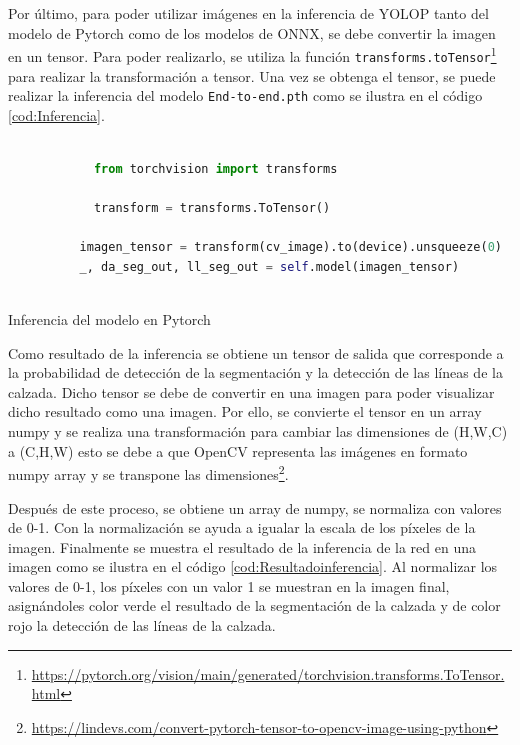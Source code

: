         Por último, para poder utilizar imágenes en la inferencia de YOLOP tanto del modelo de Pytorch como de los modelos de ONNX, se debe convertir la imagen en un tensor. Para poder realizarlo, se utiliza la función \texttt{transforms.toTensor}\footnote{\url{https://pytorch.org/vision/main/generated/torchvision.transforms.ToTensor.html}} 
        para realizar la transformación a tensor. Una vez se obtenga el tensor, se puede realizar la inferencia del modelo \texttt{End-to-end.pth} como se ilustra en el código \ref{cod:Inferencia}.
    
        \begin{code}[h]
          \begin{lstlisting}[language=Python]
         
            from torchvision import transforms
    
            transform = transforms.ToTensor() 
                        
          imagen_tensor = transform(cv_image).to(device).unsqueeze(0)
          _, da_seg_out, ll_seg_out = self.model(imagen_tensor)
        
          \end{lstlisting}
          \caption[Inferencia del modelo]{Inferencia del modelo en Pytorch}
          \label{cod:Inferencia}
          \end{code}  
    
        Como resultado de la inferencia se obtiene un tensor de salida que corresponde a la probabilidad de detección de la segmentación
        y la detección de las líneas de la calzada. Dicho tensor se debe de convertir en una imagen para poder visualizar
        dicho resultado como una imagen. 
        Por ello, se convierte el tensor en un array numpy y se realiza una transformación para cambiar las dimensiones de (H,W,C) 
        a (C,H,W) esto se debe a que OpenCV representa las imágenes en formato numpy array y se transpone las dimensiones\footnote{\url{https://lindevs.com/convert-pytorch-tensor-to-opencv-image-using-python}}. 
    
        Después de este proceso, se obtiene un array de numpy, se normaliza con valores de 0-1. Con la normalización 
        se ayuda a igualar la escala de los píxeles de la imagen. Finalmente se muestra el resultado de la inferencia de la red 
        en una imagen como se ilustra en el código \ref{cod:Resultadoinferencia}. Al normalizar los valores de 0-1, los píxeles con un valor 1 se muestran en la imagen final, asignándoles 
        color verde el resultado de la segmentación de la calzada y de color rojo la detección de las líneas de la calzada. 
    
